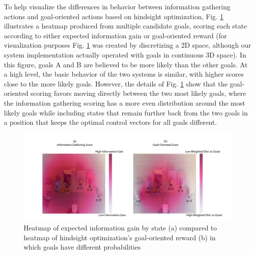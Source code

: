 \documentclass[conference]{IEEEtran}
\begin{document}
To help visualize the differences in behavior between information gathering actions and goal-oriented actions based on hindsight optimization, %
Fig. \ref{heatmap2} illustrates a heatmap produced from multiple candidate goals, scoring each state according to either expected information gain or goal-oriented reward (for visualization purposes Fig. \ref{heatmap2} was created by discretizing a 2D space, although our system implementation actually operated with goals in continuous 3D space). In this figure, goals A and B are believed to be more likely than the other goals. At a high level, the basic behavior of the two systems is similar, with higher scores close to the more likely goals. However, the details of Fig. \ref{heatmap2} show that the goal-oriented scoring favors moving directly between the two most likely goals, where the information gathering scoring has a more even distribution around the most likely goals while including states that remain further back from the two goals in a position that keeps the optimal control vectors for all goals different.


\begin{figure}
\includegraphics[width=\columnwidth]{figures/Heatmap_Uneven_Belief.pdf}
\caption{Heatmap of expected information gain by state (a) compared to heatmap of hindsight optimization's goal-oriented reward (b) in which goals have different probabilities}
\label{heatmap2}
\end{figure}
\end{document}
